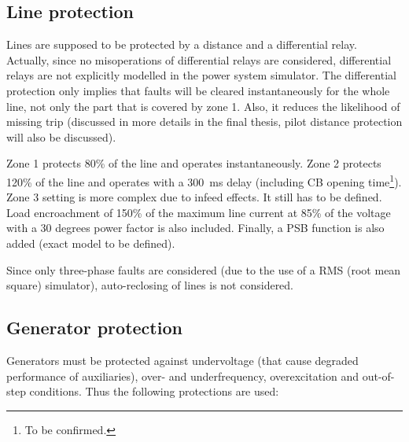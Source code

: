 \subsection{Line protection}

Lines are supposed to be protected by a distance and a differential relay. Actually, since no misoperations of differential relays are considered, differential relays are not explicitly modelled in the power system simulator. The differential protection only implies that faults will be cleared instantaneously for the whole line, not only the part that is covered by zone 1. Also, it reduces the likelihood of missing trip (discussed in more details in the final thesis, pilot distance protection will also be discussed).

Zone 1 protects 80\% of the line and operates instantaneously. Zone 2 protects 120\% of the line and operates with a 300~ms delay (including CB opening time\footnote{To be confirmed.}). Zone 3 setting is more complex due to infeed effects. It still has to be defined. Load encroachment of 150\% of the maximum line current at 85\% of the voltage with a 30 degrees power factor is also included. Finally, a PSB function is also added (exact model to be defined).

Since only three-phase faults are considered (due to the use of a RMS (root mean square) simulator), auto-reclosing of lines is not considered.


\subsection{Generator protection}

Generators must be protected against undervoltage (that cause degraded performance of auxiliaries), over- and underfrequency, overexcitation and out-of-step conditions. Thus the following protections are used:


